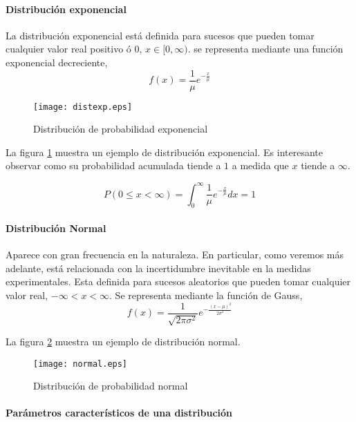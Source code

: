 \paragraph{Distribución exponencial} 
La distribución exponencial está definida para sucesos que pueden tomar cualquier valor real positivo ó 0, $x \in [0,\infty)$. se representa mediante una función exponencial decreciente,
\begin{equation*}
f(x)=\frac{1}{\mu}e^{-\frac{x}{\mu}}
\end{equation*}

\begin{figure}
\centering
\texttt{[image: distexp.eps]}
\caption{Distribución de probabilidad exponencial}
\label{fig:distexp}
\end{figure}

La figura \ref{fig:distexp} muestra un ejemplo de distribución exponencial. Es interesante observar como su probabilidad acumulada tiende a $1$ a medida que $x$ tiende a $\infty$.

\begin{equation*}
P(0\leqslant x < \infty) = \int_0^{\infty}\frac{1}{\mu}e^{-\frac{x}{\mu}}dx = 1
\end{equation*}

\paragraph{Distribución Normal} Aparece con gran frecuencia en la naturaleza. En particular, como veremos más adelante, está relacionada con la incertidumbre inevitable en la medidas experimentales. Esta definida para sucesos aleatorios que pueden tomar cualquier valor real, $-\infty < x < \infty$. Se representa mediante la función de Gauss,
\begin{equation*}
f(x)=\frac{1}{\sqrt{2\pi\sigma^2}}e^{-\frac{(x-\mu)^2}{2\sigma^2}}
\end{equation*}

La figura \ref{fig:normal} muestra un ejemplo de distribución normal.
\begin{figure}
\centering
\texttt{[image: normal.eps]}
\caption{Distribución de probabilidad normal}
\label{fig:normal}
\end{figure}

\paragraph{Parámetros característicos de una distribución}

